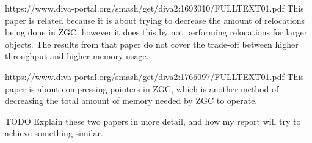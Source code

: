

https://www.diva-portal.org/smash/get/diva2:1693010/FULLTEXT01.pdf
This paper is related because it is about trying to decrease the amount of relocations being done in ZGC, however it does this by not performing relocations for larger objects. The results from that paper do not cover the trade-off between higher throughput and higher memory usage.




https://www.diva-portal.org/smash/get/diva2:1766097/FULLTEXT01.pdf
This paper is about compressing pointers in ZGC, which is another method of decreasing the total amount of memory needed by ZGC to operate.

TODO Explain these two papers in more detail, and how my report will try to achieve something similar.